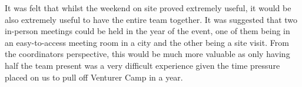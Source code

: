 It was felt that whilst the weekend on site proved extremely useful, it would be also extremely useful to have the entire team together. It was suggested that two in-person meetings could be held in the year of the event, one of them being in an easy-to-access meeting room in a city and the other being a site visit. From the coordinators perspective, this would be much more valuable as only having half the team present was a very difficult experience given the time pressure placed on us to pull off Venturer Camp in a year. 
